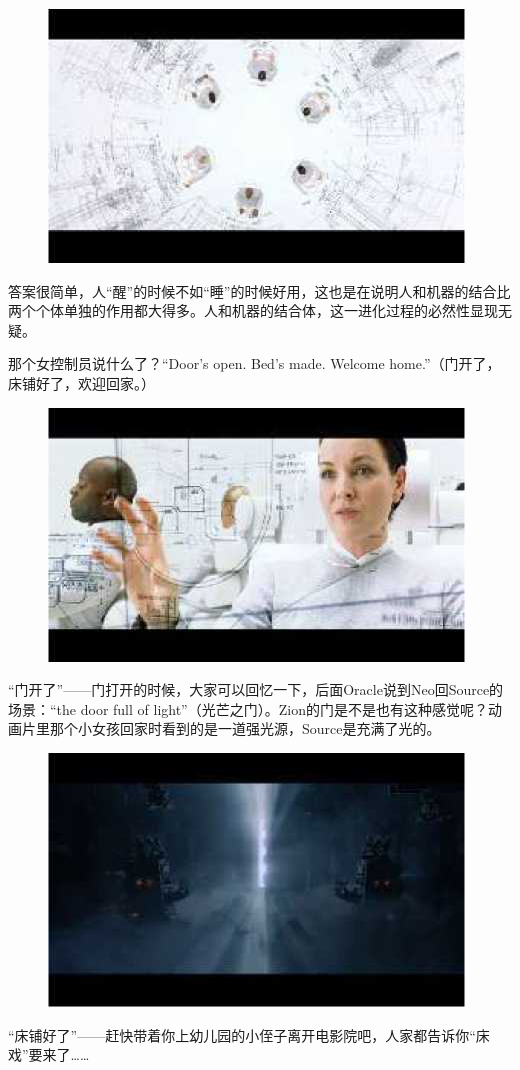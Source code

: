 \documentclass[UTF8]{ctexart}
\begin{document}
\begin{figure}[htb]
\centering
\includegraphics[width=0.5\linewidth]{fig/read_reloaded-32}
\end{figure}

答案很简单，人“醒”的时候不如“睡”的时候好用，这也是在说明人和机器的结合比两个个体单独的作用都大得多。人和机器的结合体，这一进化过程的必然性显现无疑。

那个女控制员说什么了？“Door’s open. Bed’s made. Welcome home.”（门开了，床铺好了，欢迎回家。）

\begin{figure}[htb]
\centering
\includegraphics[width=0.5\linewidth]{fig/read_reloaded-33}
\end{figure}

“门开了”——门打开的时候，大家可以回忆一下，后面Oracle说到Neo回Source的场景：“the door full of light”（光芒之门）。Zion的门是不是也有这种感觉呢？动画片里那个小女孩回家时看到的是一道强光源，Source是充满了光的。

\begin{figure}[htb]
\centering
\includegraphics[width=0.5\linewidth]{fig/read_reloaded-34}
\end{figure}

“床铺好了”——赶快带着你上幼儿园的小侄子离开电影院吧，人家都告诉你“床戏”要来了……
\end{document}
